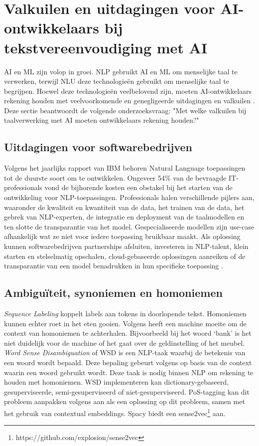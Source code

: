 \section{Valkuilen en uitdagingen voor AI-ontwikkelaars bij tekstvereenvoudiging met AI}

AI en ML zijn volop in groei. NLP gebruikt AI en ML om menselijke taal te verwerken, terwijl NLU deze technologieën gebruikt om menselijke taal te begrijpen. Hoewel deze technologieën veelbelovend zijn, moeten AI-ontwikkelaars rekening houden met veelvoorkomende en genegligeerde uitdagingen en valkuilen \autocite{Sciforce2020, Roldos2020, Khurana2022}. Deze sectie beantwoordt de volgende onderzoeksvraag: "Met welke valkuilen bij taalverwerking met AI moeten ontwikkelaars rekening houden?"

\subsection{Uitdagingen voor softwarebedrijven}

Volgens het jaarlijks rapport van IBM behoren Natural Language toepassingen tot de duurste soort om te ontwikkelen. Ongeveer 54\% van de bevraagde IT-professionals vond de bijhorende kosten een obstakel bij het starten van de ontwikkeling voor NLP-toepassingen. Professionals halen verschillende pijlers aan, waaronder de kwaliteit en kwantiteit van de data, het trainen van de data, het gebrek van NLP-experten, de integratie en deployment van de taalmodellen en ten slotte de transparantie van het model. Gespecialiseerde modellen zijn use-case afhankelijk wat ze niet voor iedere toepassing bruikbaar maakt. Als oplossing kunnen softwarebedrijven partnerships afsluiten, investeren in NLP-talent, klein starten en stelselmatig opschalen, cloud-gebaseerde oplossingen aanreiken of de transparantie van een model benadrukken in hun specifieke toepassing \autocite{IBM2022}.

\subsection{Ambiguïteit, synoniemen en homoniemen}

\textit{Sequence Labeling} koppelt labels aan tokens in doorlopende tekst. Homoniemen kunnen echter roet in het eten gooien. Volgens \textcite{Roldos2020} heeft een machine moeite om de context van homoniemen te achterhalen. Bijvoorbeeld bij het woord ‘bank’ is het niet duidelijk voor de machine of het gaat over de geldinstelling of het meubel. \textit{Word Sense Disambiguation} of WSD is een NLP-taak waarbij de betekenis van een woord wordt bepaald. Deze bepaling gebeurt volgens \autocite{Eisenstein2019} op basis van de context waarin een woord gebruikt wordt. Deze taak is nodig binnen NLP om rekening te houden met homoniemen. WSD implementeren kan dictionary-gebaseerd, gesuperviseerde, semi-gesuperviseerd of niet-gesuperviseerd. PoS-tagging kan dit probleem aanpakken volgens \textcite{Liu2020} aan als een oplossing op dit probleem, samen met het gebruik van contextual embeddings. Spacy biedt een sense2vec\footnote{https://github.com/explosion/sense2vec} aan.

